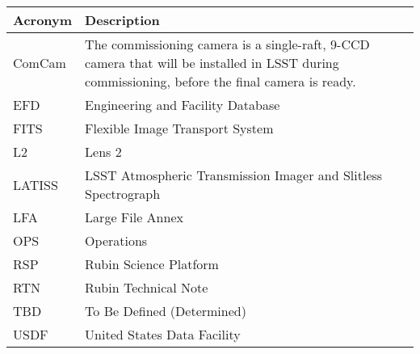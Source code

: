 \addtocounter{table}{-1}
\begin{longtable}{p{}p{}}\hline
\textbf{Acronym} & \textbf{Description}  \\\hline

ComCam & The commissioning camera is a single-raft, 9-CCD camera that will be installed in LSST during commissioning, before the final camera is ready. \\\hline
EFD & Engineering and Facility Database \\\hline
FITS & Flexible Image Transport System \\\hline
L2 & Lens 2 \\\hline
LATISS & LSST Atmospheric Transmission Imager and Slitless Spectrograph \\\hline
LFA & Large File Annex \\\hline
OPS & Operations \\\hline
RSP & Rubin Science Platform \\\hline
RTN & Rubin Technical Note \\\hline
TBD & To Be Defined (Determined) \\\hline
USDF & United States Data Facility \\\hline
\end{longtable}
